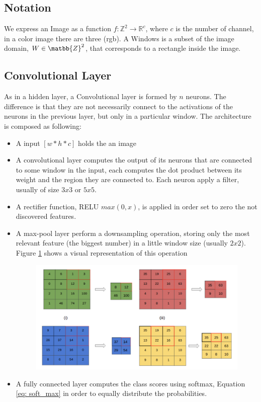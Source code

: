 \documentclass[11pt]{article}
\begin{document}
\subsection{Notation}
We express an Image as a function $f: \mathbb{Z}^2 \rightarrow \mathbb{R}^c$, where $c$ is the number of channel, in a color image there are three (rgb). A Windows is a subset of the image domain, $W \in \matbb{Z}^2$, that corresponds to a rectangle inside the image.
\subsection{Convolutional Layer}
As in a hidden layer, a Convolutional layer is formed by $n$ neurons. The difference is that they are not necessarily connect to the activations of the neurons in the previous layer, but only in a particular window.
The architecture is composed as following:
\begin{itemize}
	\item A input $[w*h*c]$ holds the an image
	\item A convolutional layer computes the output of its neurons that are connected to some window in the input, each computes the dot product between its weight and the region they are connected to. Each neuron apply a filter, usually of size $3x3$ or $5x5$.
	\item A rectifier function, RELU $max(0,x)$, is applied in order set to zero the not discovered features.
	\item A max-pool layer perform a downsampling operation, storing only the most relevant feature (the biggest number) in a little window size (usually $2x2$). Figure \ref{fig: pool} shows a visual representation of this operation
\begin{figure}[H]
\centering
	\includegraphics[scale=0.5]{images/pool}
	\caption{}
	\label{fig: pool}
\end{figure}
	\item A fully connected layer computes the class scores using softmax, Equation \ref{eq: soft_max} in order to equally distribute the probabilities.
\end{itemize}
\end{document}
